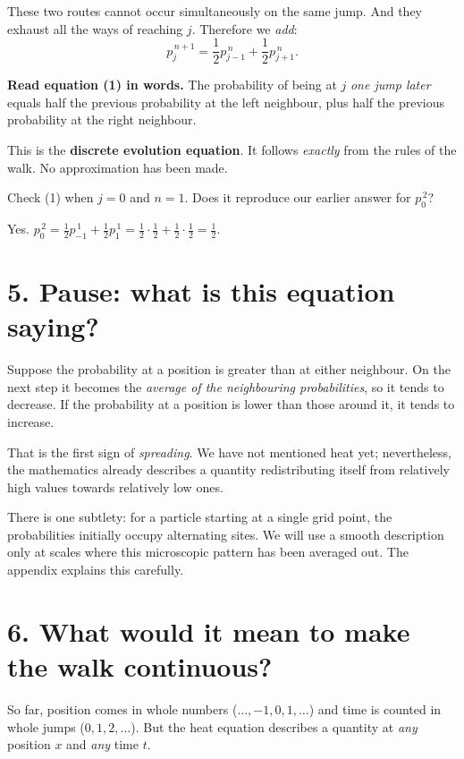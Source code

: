 \documentclass[11pt,a4paper]{article}
\newcommand{\ans}[1]{\par\vspace{4pt}{\small\color{blue}\textbf{Answer.}}\enspace #1}
\newcommand{\aside}[1]{{\small\color{muted}#1}}
\begin{document}
These two routes cannot occur simultaneously on the same jump. And they exhaust all the ways of reaching $j$. Therefore we \emph{add}:
\[
\boxed{\displaystyle p_j^{\,n+1}=\frac12p_{j-1}^{\,n}+\frac12p_{j+1}^{\,n}.}
\tag{1}
\]
\begin{takeaway}
\textbf{Read equation (1) in words.} The probability of being at $j$ \emph{one jump later} equals half the previous probability at the left neighbour, plus half the previous probability at the right neighbour.

This is the \textbf{discrete evolution equation}. It follows \emph{exactly} from the rules of the walk. No approximation has been made.
\end{takeaway}

\begin{think}
Check (1) when $j=0$ and $n=1$. Does it reproduce our earlier answer for $p_0^{\,2}$?
\ans{Yes. $p_0^{\,2}=\tfrac12p_{-1}^{\,1}+\tfrac12p_1^{\,1}=\tfrac12\cdot\tfrac12+\tfrac12\cdot\tfrac12=\tfrac12$.}
\end{think}

\section{5. Pause: what is this equation saying?}
Suppose the probability at a position is greater than at either neighbour. On the next step it becomes the \emph{average of the neighbouring probabilities}, so it tends to decrease. If the probability at a position is lower than those around it, it tends to increase.

That is the first sign of \emph{spreading}. We have not mentioned heat yet; nevertheless, the mathematics already describes a quantity redistributing itself from relatively high values towards relatively low ones.

\aside{There is one subtlety: for a particle starting at a single grid point, the probabilities initially occupy alternating sites. We will use a smooth description only at scales where this microscopic pattern has been averaged out. The appendix explains this carefully.}

\section{6. What would it mean to make the walk continuous?}
So far, position comes in whole numbers ($\ldots,-1,0,1,\ldots$) and time is counted in whole jumps ($0,1,2,\ldots$). But the heat equation describes a quantity at \emph{any} position $x$ and \emph{any} time $t$.
\end{document}
